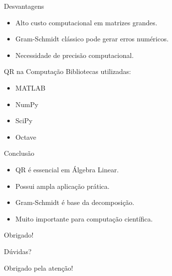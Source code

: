 \documentclass{beamer}
\begin{document}
\begin{frame}{Desvantagens}
\begin{itemize}
    \item Alto custo computacional em matrizes grandes.
    \item Gram-Schmidt clássico pode gerar erros numéricos.
    \item Necessidade de precisão computacional.
\end{itemize}
\end{frame}

\begin{frame}{QR na Computação}
Bibliotecas utilizadas:
\begin{itemize}
    \item MATLAB
    \item NumPy
    \item SciPy
    \item Octave
\end{itemize}
\end{frame}

\begin{frame}{Conclusão}
\begin{itemize}
    \item QR é essencial em Álgebra Linear.
    \item Possui ampla aplicação prática.
    \item Gram-Schmidt é base da decomposição.
    \item Muito importante para computação científica.
\end{itemize}
\end{frame}

\begin{frame}{Obrigado!}
\centering

\Huge Dúvidas?

\vspace{1cm}

\Large Obrigado pela atenção!
\end{frame}
\end{document}
